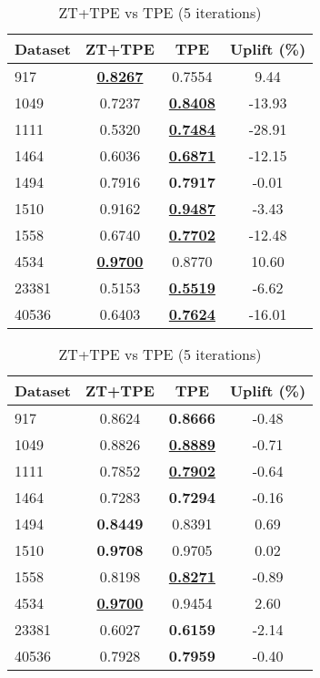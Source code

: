 \begin{table}[htbp]
\begin{center}
\begin{small}
\begin{sc}
\begin{subtable}[t]{0.48\textwidth}
    \centering
    \caption{ZT+TPE vs TPE (1 iteration)}
    \label{tab:decisiontree-optuna-1}
    \begin{tabular}{lccc}
    \toprule
    \textbf{Dataset} & \textbf{ZT+TPE} & \textbf{TPE} & \textbf{Uplift (\%)} \\
    \midrule
    917    & \underline{\textbf{0.8267}} & 0.7554 & 9.44 \\
    1049    & 0.7237 & \underline{\textbf{0.8408}} & -13.93 \\
    1111    & 0.5320 & \underline{\textbf{0.7484}} & -28.91 \\
    1464    & 0.6036 & \underline{\textbf{0.6871}} & -12.15 \\
    1494    & 0.7916 & \textbf{0.7917} & -0.01 \\
    1510    & 0.9162 & \underline{\textbf{0.9487}} & -3.43 \\
    1558    & 0.6740 & \underline{\textbf{0.7702}} & -12.48 \\
    4534    & \underline{\textbf{0.9700}} & 0.8770 & 10.60 \\
    23381    & 0.5153 & \underline{\textbf{0.5519}} & -6.62 \\
    40536    & 0.6403 & \underline{\textbf{0.7624}} & -16.01 \\
    \bottomrule
    \end{tabular}
\end{subtable}
\hfill
\begin{subtable}[t]{0.48\textwidth}
    \centering
    \caption{ZT+TPE vs TPE (5 iterations)}
    \label{tab:decisiontree-optuna-5}
    \begin{tabular}{lccc}
    \toprule
    \textbf{Dataset} & \textbf{ZT+TPE} & \textbf{TPE} & \textbf{Uplift (\%)} \\
    \midrule
    917    & 0.8624 & \textbf{0.8666} & -0.48 \\
    1049    & 0.8826 & \underline{\textbf{0.8889}} & -0.71 \\
    1111    & 0.7852 & \underline{\textbf{0.7902}} & -0.64 \\
    1464    & 0.7283 & \textbf{0.7294} & -0.16 \\
    1494    & \textbf{0.8449} & 0.8391 & 0.69 \\
    1510    & \textbf{0.9708} & 0.9705 & 0.02 \\
    1558    & 0.8198 & \underline{\textbf{0.8271}} & -0.89 \\
    4534    & \underline{\textbf{0.9700}} & 0.9454 & 2.60 \\
    23381    & 0.6027 & \textbf{0.6159} & -2.14 \\
    40536    & 0.7928 & \textbf{0.7959} & -0.40 \\
    \bottomrule
    \end{tabular}
\end{subtable}


\end{sc}
\end{small}
\end{center}
\end{table}
